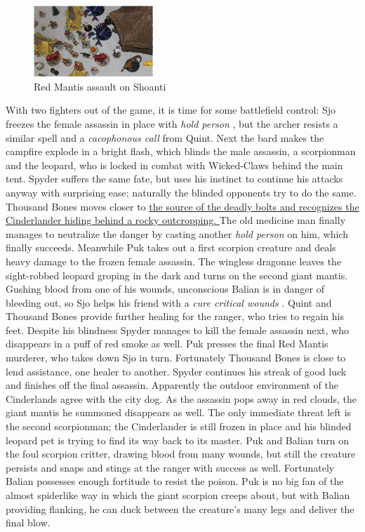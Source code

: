 \begin{figure}[h]
	\centering
	\includegraphics[width=0.4\textwidth]{images/Red-Mantis-assault-on-Shoanti-603326119_mod.jpg}
	\caption{Red Mantis assault on Shoanti}
	\label{fig:Red-Mantis-assault-on-Shoanti-603326119}
\end{figure}

With two fighters out of the game, it is time for some battlefield control: Sjo freezes the female assassin in place with {\itshape hold person} , but the archer resists a similar spell and a  {\itshape cacophonous call} from Quint. Next the bard makes the campfire explode in a bright flash, which blinds the male assassin, a scorpionman and the leopard, who is locked in combat with Wicked-Claws behind the main tent. Spyder suffers the same fate, but uses his instinct to continue his attacks anyway with surprising ease; naturally the blinded opponents try to do the same. Thousand Bones moves closer to \hyperref[fig:The-Cinderlander-from-Curse-of-the-Crimson-Throne-603327133]{ the source of the deadly bolts and recognizes the Cinderlander hiding behind a rocky outcropping. } The old medicine man finally manages to neutralize the danger by casting another  {\itshape hold person} on him, which finally succeeds. Meanwhile Puk takes out a first scorpion creature and deals heavy damage to the frozen female assassin. The wingless dragonne leaves the sight-robbed leopard groping in the dark and turns on the second giant mantis. Gushing blood from one of his wounds, unconscious Balian is in danger of bleeding out, so Sjo helps his friend with a  {\itshape cure critical wounds} . Quint and Thousand Bones provide further healing for the ranger, who tries to regain his feet. Despite his blindness Spyder manages to kill the female assassin next, who disappears in a puff of red smoke as well. Puk presses the final Red Mantis murderer, who takes down Sjo in turn. Fortunately Thousand Bones is close to lend assistance, one healer to another. Spyder continues his streak of good luck and finishes off the final assassin. Apparently the outdoor environment of the Cinderlands agree with the city dog. As the assassin pops away in red clouds, the giant mantis he summoned disappears as well. The only immediate threat left is the second scorpionman; the Cinderlander is still frozen in place and his blinded leopard pet is trying to find its way back to its master. Puk and Balian turn on the foul scorpion critter, drawing blood from many wounds, but still the creature persists and snaps and stings at the ranger with success as well. Fortunately Balian possesses enough fortitude to resist the poison. Puk is no big fan of the almost spiderlike way in which the giant scorpion creeps about, but with Balian providing flanking, he can duck between the creature's many legs and deliver the final blow. \\


